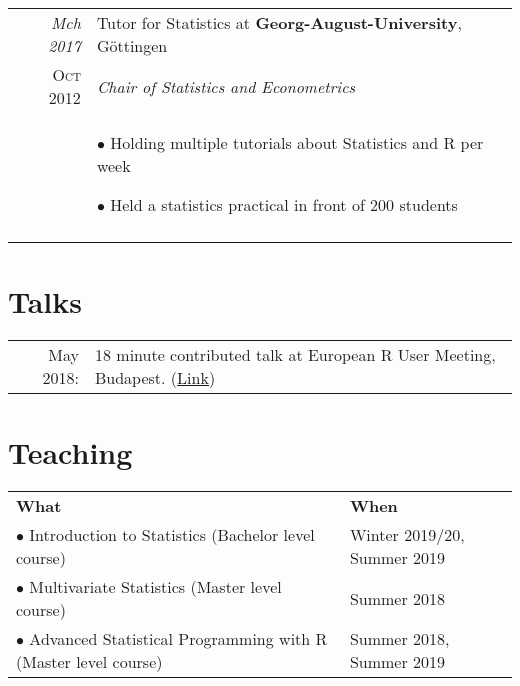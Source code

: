 \documentclass[a4paper,10pt]{article} %
\begin{document}
\begin{longtable}{r|p{10cm}}

\emph{Mch 2017} & Tutor for Statistics at \textbf{Georg-August-University}, Göttingen\\
\textsc{Oct 2012} & \emph{Chair of Statistics and Econometrics}\\
& \footnotesize{$\bullet$ Holding multiple tutorials about Statistics and R per week

$\bullet$ Held a statistics practical in front of 200 students}\\
\multicolumn{2}{c}{} \\


\end{longtable}


\section{Talks}
\begin{tabular}{rl}
May 2018: & 18 minute contributed talk at European R User Meeting, Budapest. (\href{https://www.youtube.com/watch?v=ZeBvYWCxkOE}{Link})\\
\end{tabular}

\section{Teaching}
\begin{tabular}{ll}
\textbf{What} & \textbf{When} \\
$\bullet$ Introduction to Statistics (Bachelor level course) & Winter 2019/20, Summer 2019 \\
$\bullet$ Multivariate Statistics (Master level course) & Summer 2018 \\
$\bullet$ Advanced Statistical Programming with R (Master level course) & Summer 2018, Summer 2019
\end{tabular}

\end{document}
